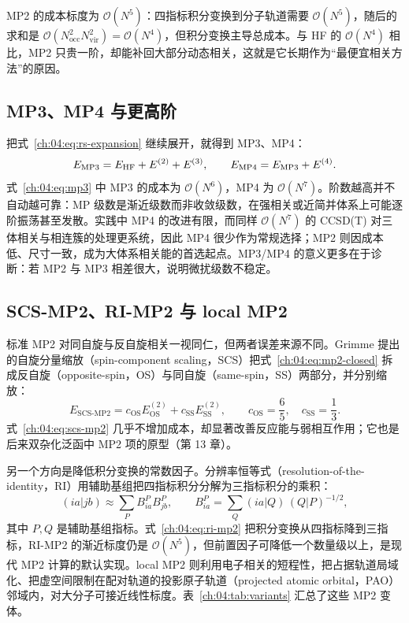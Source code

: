 MP2 的成本标度为 $\mathcal{O}(N^5)$：四指标积分变换到分子轨道需要 $\mathcal{O}(N^5)$，随后的求和是 $\mathcal{O}(N_{\mathrm{occ}}^2N_{\mathrm{vir}}^2)=\mathcal{O}(N^4)$，但积分变换主导总成本。与 HF 的 $\mathcal{O}(N^4)$ 相比，MP2 只贵一阶，却能补回大部分动态相关，这就是它长期作为“最便宜相关方法”的原因。

\subsection{MP3、MP4 与更高阶}
\label{ch:04:sec:mp3}

把式~\eqref{ch:04:eq:rs-expansion} 继续展开，就得到 MP3、MP4：
\begin{equation}
E_{\mathrm{MP3}} = E_{\mathrm{HF}} + E^{(2)} + E^{(3)},
\qquad
E_{\mathrm{MP4}} = E_{\mathrm{MP3}} + E^{(4)} .
\label{ch:04:eq:mp3}
\end{equation}
式~\eqref{ch:04:eq:mp3} 中 MP3 的成本为 $\mathcal{O}(N^6)$，MP4 为 $\mathcal{O}(N^7)$。阶数越高并不自动越可靠：MP 级数是渐近级数而非收敛级数，在强相关或近简并体系上可能逐阶振荡甚至发散\citep{szabo1996,helgaker2000}。实践中 MP4 的改进有限，而同样 $\mathcal{O}(N^7)$ 的 CCSD(T) 对三体相关与相连簇的处理更系统，因此 MP4 很少作为常规选择；MP2 则因成本低、尺寸一致，成为大体系相关能的首选起点。MP3/MP4 的意义更多在于诊断：若 MP2 与 MP3 相差很大，说明微扰级数不稳定。

\subsection{SCS-MP2、RI-MP2 与 local MP2}
\label{ch:04:sec:variants}

标准 MP2 对同自旋与反自旋相关一视同仁，但两者误差来源不同。Grimme 提出的自旋分量缩放（spin-component scaling，SCS）把式~\eqref{ch:04:eq:mp2-closed} 拆成反自旋（opposite-spin，OS）与同自旋（same-spin，SS）两部分，并分别缩放\citep{grimme2003scsmp2}：
\begin{equation}
E_{\mathrm{SCS\text{-}MP2}}
= c_{\mathrm{OS}}E^{(2)}_{\mathrm{OS}}
+ c_{\mathrm{SS}}E^{(2)}_{\mathrm{SS}},
\qquad
c_{\mathrm{OS}}=\frac{6}{5},\quad c_{\mathrm{SS}}=\frac{1}{3}.
\label{ch:04:eq:scs-mp2}
\end{equation}
式~\eqref{ch:04:eq:scs-mp2} 几乎不增加成本，却显著改善反应能与弱相互作用；它也是后来双杂化泛函中 MP2 项的原型（第 13 章）。

另一个方向是降低积分变换的常数因子。分辨率恒等式（resolution-of-the-identity，RI）用辅助基组把四指标积分分解为三指标积分的乘积：
\begin{equation}
(ia|jb) \approx \sum_P B_{ia}^{P}B_{jb}^{P},
\qquad
B_{ia}^{P} = \sum_Q (ia|Q)\,(Q|P)^{-1/2},
\label{ch:04:eq:ri-mp2}
\end{equation}
其中 $P,Q$ 是辅助基组指标。式~\eqref{ch:04:eq:ri-mp2} 把积分变换从四指标降到三指标，RI-MP2 的渐近标度仍是 $\mathcal{O}(N^5)$，但前置因子可降低一个数量级以上，是现代 MP2 计算的默认实现。local MP2 则利用电子相关的短程性，把占据轨道局域化、把虚空间限制在配对轨道的投影原子轨道（projected atomic orbital，PAO）邻域内，对大分子可接近线性标度\citep{jensen2017}。表~\ref{ch:04:tab:variants} 汇总了这些 MP2 变体。

